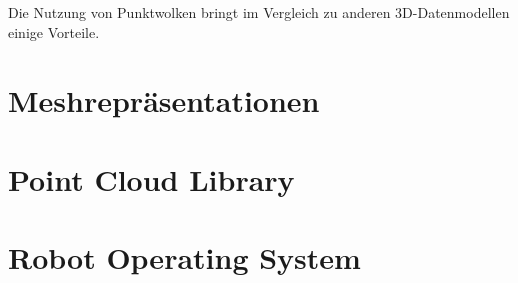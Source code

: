 Die Nutzung von Punktwolken bringt im Vergleich zu anderen 3D-Datenmodellen einige Vorteile.


\section{Meshrepräsentationen}


\section{Point Cloud Library}


\section{Robot Operating System}
